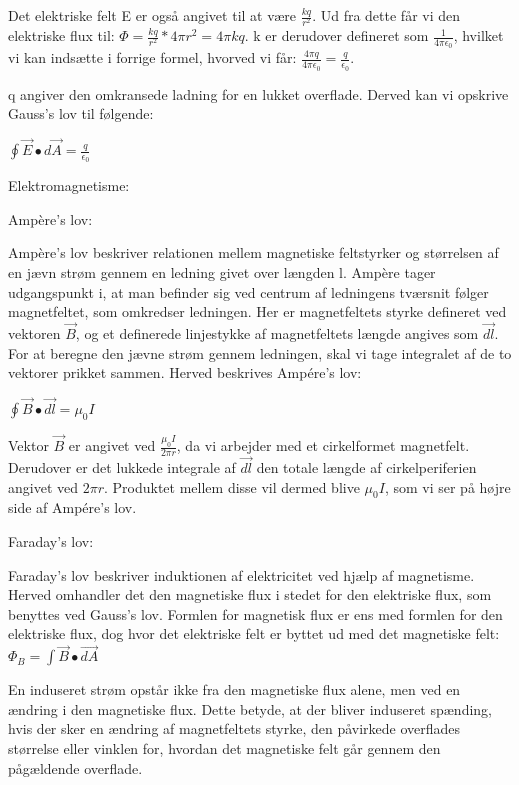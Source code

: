Det elektriske felt E er også angivet til at være $\frac{kq}{r^2}$. Ud fra dette får vi den elektriske flux til: $\Phi = \frac{kq}{r^2} * 4 \pi r^2 = 4 \pi k q$. k er derudover defineret som $\frac{1}{4 \pi \epsilon_0}$, hvilket vi kan indsætte i forrige formel, hvorved vi får: $\frac{4 \pi q}{4 \pi \epsilon_0} = \frac{q}{\epsilon_0}$.

q angiver den omkransede ladning for en lukket overflade. Derved kan vi opskrive Gauss's lov til følgende:

\centerline{$\oint \vec{E} \bullet d \vec{A} = \frac{q}{\epsilon_0}$}

Elektromagnetisme:

Ampère's lov:

Ampère's lov beskriver relationen mellem magnetiske feltstyrker og størrelsen af en jævn strøm gennem en ledning givet over længden l. Ampère tager udgangspunkt i, at man befinder sig ved centrum af ledningens tværsnit følger magnetfeltet, som omkredser ledningen. Her er magnetfeltets styrke defineret ved vektoren $\vec{B}$, og et definerede linjestykke af magnetfeltets længde angives som $\vec{dl}$. For at beregne den jævne strøm gennem ledningen, skal vi tage integralet af de to vektorer prikket sammen. Herved beskrives Ampére's lov:

\centerline{$\oint \vec{B} \bullet \vec{dl} = \mu_0 I$}

Vektor $\vec{B}$ er angivet ved $\frac{\mu_0 I}{2 \pi r}$, da vi arbejder med et cirkelformet magnetfelt. Derudover er det lukkede integrale af $\vec{dl}$ den totale længde af cirkelperiferien angivet ved $2 \pi r$. Produktet mellem disse vil dermed blive $\mu_0 I$, som vi ser på højre side af Ampére's lov.

Faraday's lov:

Faraday's lov beskriver induktionen af elektricitet ved hjælp af magnetisme. Herved omhandler det den magnetiske flux i stedet for den elektriske flux, som benyttes ved Gauss's lov. Formlen for magnetisk flux er ens med formlen for den elektriske flux, dog hvor det elektriske felt er byttet ud med det magnetiske felt: $\Phi_B = \int \vec{B} \bullet \vec{dA}$

En induseret strøm opstår ikke fra den magnetiske flux alene, men ved en ændring i den magnetiske flux. Dette betyde, at der bliver induseret spænding, hvis der sker en ændring af magnetfeltets styrke, den påvirkede overflades størrelse eller vinklen for, hvordan det magnetiske felt går gennem den pågældende overflade.

